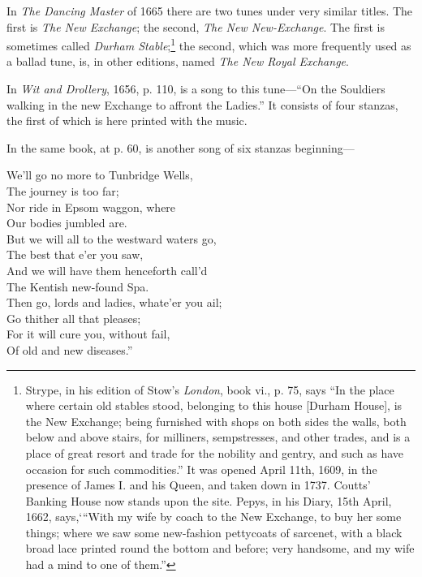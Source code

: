 
In \textit{The Dancing Master} of 1665 there are two tunes under very similar titles.
The first is \textit{The New Exchange}; the second, \textit{The New New-Exchange}. The first
is sometimes called \textit{Durham Stable};\footnote{
Strype, in his edition of Stow’s \textit{London}, book vi., p. 75,
says “In the place where certain old stables stood, belonging
to this house [Durham House], is the New Exchange;
being furnished with shops on both sides the walls, both
below and above stairs, for milliners, sempstresses, and
other trades, and is a place of great resort and trade for
the nobility and gentry, and such as have occasion for
such commodities.” It was opened April 11th, 1609, in
the presence of James I. and his Queen, and taken down
in 1737. Coutts’ Banking House now stands upon the
site. Pepys, in his Diary, 15th April, 1662, says,‘“With
my wife by coach to the New Exchange, to buy her some
things; where we saw some new-fashion pettycoats of
sarcenet, with a black broad lace printed round the bottom
and before; very handsome, and my wife had a mind to
one of them.”
}
 the second, which was more frequently
used as a ballad tune, is, in other editions, named \textit{The New Royal Exchange}.

In \textit{Wit and Drollery}, 1656, p. 110, is a song to this tune—“On the Souldiers
walking in the new Exchange to affront the Ladies.” It consists of four stanzas,
the first of which is here printed with the music.

In the same book, at p. 60, is another song of six stanzas beginning—


\settowidth{\versewidth}{We’ll go no more to Tunbridge Well,}
\begin{dcverse}\begin{altverse}
We’ll go no more to Tunbridge Wells,\\
The journey is too far;\\
Nor ride in Epsom waggon, where\\
Our bodies jumbled are.\\
But we will all to the westward waters go,\\
The best that e’er you saw,\\
And we will have them henceforth call’d\\
The Kentish new-found Spa.\\
Then go, lords and ladies, whate’er you ail;\\
Go thither all that pleases;\\
For it will cure you, without fail,\\
Of old and new diseases.”
\end{altverse}
\end{dcverse}

